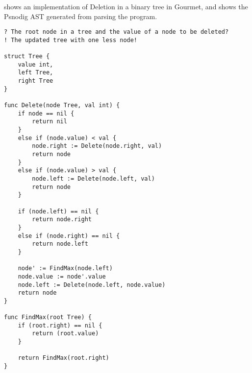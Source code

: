  shows an implementation of Deletion in a binary tree in Gourmet, and  shows the Psnodig AST generated from parsing the program. \\

\begin{lstlisting}[caption={Deletion in a binary search tree implementation in Gourmet.}, captionpos=b, label={deleteBSTGourmet}]
? The root node in a tree and the value of a node to be deleted?
! The updated tree with one less node!

struct Tree {
    value int,
    left Tree,
    right Tree
}

func Delete(node Tree, val int) {
    if node == nil {
        return nil
    }
    else if (node.value) < val {
        node.right := Delete(node.right, val)
        return node
    }
    else if (node.value) > val {
        node.left := Delete(node.left, val)
        return node
    }

    if (node.left) == nil {
        return node.right
    }
    else if (node.right) == nil {
        return node.left
    }

    node' := FindMax(node.left)
    node.value := node'.value
    node.left := Delete(node.left, node.value)
    return node
}

func FindMax(root Tree) {
    if (root.right) == nil {
        return (root.value)
    }

    return FindMax(root.right)
}
\end{lstlisting}

